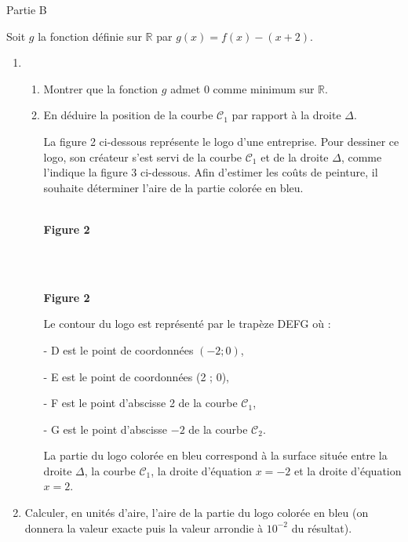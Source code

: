 \begin{h3}Partie B\end{h3}
Soit $g$ la fonction définie sur $\mathbb{R}$ par $g\left(x\right)=f\left(x\right)-\left(x+2\right)$.
\begin{enumerate}
     \item
     \begin{enumerate}
          \item
          Montrer que la fonction $g$ admet $0$ comme minimum sur $\mathbb{R}$.
          \item
          En déduire la position de la courbe $\mathscr C_{1}$ par rapport à la droite $\Delta $.
          \par
          La figure 2 ci-dessous représente le logo d'une entreprise. Pour dessiner ce logo, son créateur s'est servi de la courbe $\mathscr C_{1}$ et de la droite $\Delta $, comme l'indique la figure 3 ci-dessous. Afin d'estimer les coûts de peinture, il souhaite déterminer l'aire de la partie colorée en bleu.

\begin{center}
\\ \textbf{Figure 2}
\end{center}
\\
\begin{center}
\\ \textbf{Figure 2}
\end{center}

          Le contour du logo est représenté par le trapèze DEFG où :
          \par
          - D est le point de coordonnées $\left(-2 ; 0\right)$,
          \par
          - E est le point de coordonnées (2 ; 0),
          \par
          - F est le point d'abscisse 2 de la courbe $\mathscr C_{1}$,
          \par
          - G est le point d'abscisse $-2$ de la courbe $\mathscr C_{2}$.
          \par
     La partie du logo colorée en bleu correspond à la surface située entre la droite $\Delta $, la courbe $\mathscr C_{1}$, la droite d'équation $x =-2$ et la droite d'équation $x=2$.\end{enumerate}
     \item
Calculer, en unités d'aire, l'aire de la partie du logo colorée en bleu (on donnera la valeur exacte puis la valeur arrondie à $10^{-2}$ du résultat).\end{enumerate}
